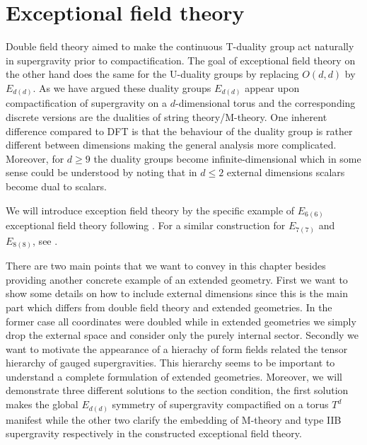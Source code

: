 \chapter{Exceptional field theory\label{chap:ExceptionalFieldTheory}}

Double field theory aimed to make the continuous T-duality group act naturally in supergravity prior to compactification. The goal of exceptional field theory on the other hand does the same for the U-duality groups by replacing $O(d,d)$ by $E_{d(d)}$. As we have argued these duality groups $E_{d(d)}$ appear upon compactification of supergravity on a $d$-dimensional torus and the corresponding discrete versions are the dualities of string theory/M-theory. One inherent difference compared to DFT is that the behaviour of the duality group is rather different between dimensions making the general analysis more complicated. Moreover, for $d\geq 9$ the duality groups become infinite-dimensional which in some sense could be understood by noting that in $d\leq 2$ external dimensions scalars become dual to scalars. %

We will introduce exception field theory by the specific example of $E_{6(6)}$ exceptional field theory following \cite{E62014}. For a similar construction for $E_{7(7)}$ and $E_{8(8)}$, see \cite{E72014,E82014}. 

There are two main points that we want to convey in this chapter besides providing another concrete example of an extended geometry. First we want to show some details on how to include external dimensions since this is the main part which differs from double field theory and extended geometries. In the former case all coordinates were doubled while in extended geometries we simply drop the external space and consider only the purely internal sector. Secondly we want to motivate the appearance of a hierachy of form fields related the tensor hierarchy of gauged supergravities. This hierarchy seems to be important to understand a complete formulation of extended geometries. Moreover, we will demonstrate three different solutions to the section condition, the first solution makes the global $E_{d(d)}$ symmetry of supergravity compactified on a torus $T^d$ manifest while the other two clarify the embedding of M-theory and type IIB supergravity respectively in the constructed exceptional field theory. 

